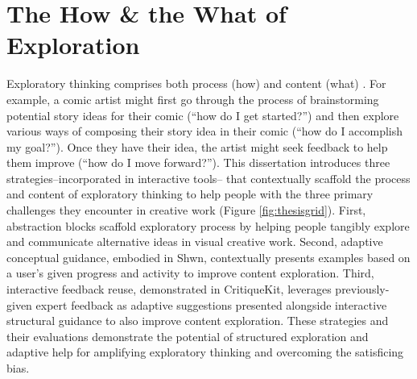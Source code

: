 \section{The How \& the What of Exploration}

Exploratory thinking comprises both process (how) and content (what) \cite{Kelley2013, kemp2007learning, Newell1962processes, osborn1953applied}. For example, a comic artist might first go through the process of brainstorming potential story ideas for their comic (“how do I get started?”) and then explore various ways of composing their story idea in their comic (“how do I accomplish my goal?”). Once they have their idea, the artist might seek feedback to help them improve (“how do I move forward?”). This dissertation introduces three strategies--incorporated in interactive tools-- that contextually scaffold the process and content of exploratory thinking to help people with the three primary challenges they encounter in creative work (Figure \ref{fig:thesisgrid}). First, abstraction blocks scaffold exploratory process by helping people tangibly explore and communicate alternative ideas in visual creative work. Second, adaptive conceptual guidance, embodied in Shwn, contextually presents examples based on a user’s given progress and activity to improve content exploration. Third, interactive feedback reuse, demonstrated in CritiqueKit, leverages previously-given expert feedback as adaptive suggestions presented alongside interactive structural guidance to also improve content exploration. These strategies and their evaluations demonstrate the potential of structured exploration and adaptive help for amplifying exploratory thinking and overcoming the satisficing bias.

